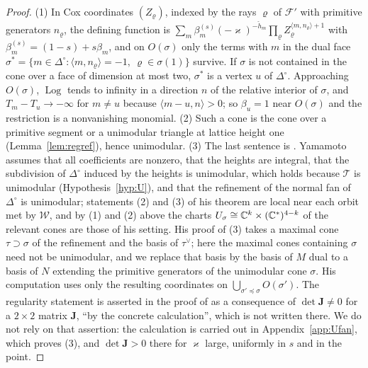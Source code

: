 \begin{proof}
(1) In Cox coordinates $(Z_\varrho)$, indexed by the rays $\varrho$ of $\mathcal F'$ with primitive generators $n_\varrho$, the
defining function is $\sum_m\beta^{(s)}_m(-\varkappa)^{-\check h_m}\prod_\varrho Z_\varrho^{\langle m,n_\varrho\rangle+1}$ with
$\beta^{(s)}_m=(1-s)+s\beta_m$, and on $O(\sigma)$ only the terms with $m$ in the dual face
$\sigma^*=\{m\in\Delta^\circ:\langle m,n_\varrho\rangle=-1,\ \varrho\in\sigma(1)\}$ survive. If $\sigma$ is not contained in the
cone over a face of dimension at most two, $\sigma^*$ is a vertex $u$ of $\Delta^\circ$. Approaching $O(\sigma)$,
$\operatorname{Log}$ tends to infinity in a direction $n$ of the relative interior of $\sigma$, and $T_m-T_u\to-\infty$ for
$m\ne u$ because $\langle m-u,n\rangle>0$; so $\beta_u=1$ near $O(\sigma)$ and the restriction is a nonvanishing monomial.
(2) Such a cone is the cone over a primitive segment or a unimodular triangle at lattice height one (Lemma~\ref{lem:regref}),
hence unimodular. (3) The last sentence is \cite[Thm.~3.9(2),(3)]{Ya16}. Yamamoto assumes that all coefficients are nonzero,
that the heights are integral, that the subdivision of $\Delta^\circ$ induced by the heights is unimodular, which holds because
$\mathcal T$ is unimodular (Hypothesis~\ref{hyp:U}), and that the refinement of the normal fan of $\Delta^\circ$ is unimodular;
statements (2) and (3) of his theorem are local near each orbit met by $\mathscr W$, and by (1) and (2) above the charts
$U_\sigma\cong\mathbb C^k\times(\mathbb C^*)^{4-k}$ of the relevant cones are those of his setting. His proof of (3) takes a maximal cone
$\tau\supset\sigma$ of the refinement and the basis of $\tau^\vee$; here the maximal cones containing $\sigma$ need not be
unimodular, and we replace that basis by the basis of $M$ dual to a basis of $N$ extending the primitive generators of the
unimodular cone $\sigma$. His computation uses only the resulting coordinates on $\bigcup_{\sigma'\preceq\sigma}O(\sigma')$. The regularity statement is asserted in
the proof of \cite[Thm.~3.9]{Ya16} as a consequence of $\det\mathbf J\neq0$ for a $2\times2$ matrix $\mathbf J$, ``by the
concrete calculation'', which is not written there. We do not rely on that assertion: the calculation is carried out in
Appendix~\ref{app:Ufan}, which proves (3), and $\det\mathbf J>0$ there for $\varkappa$ large, uniformly in $s$ and in the point.
\end{proof}

